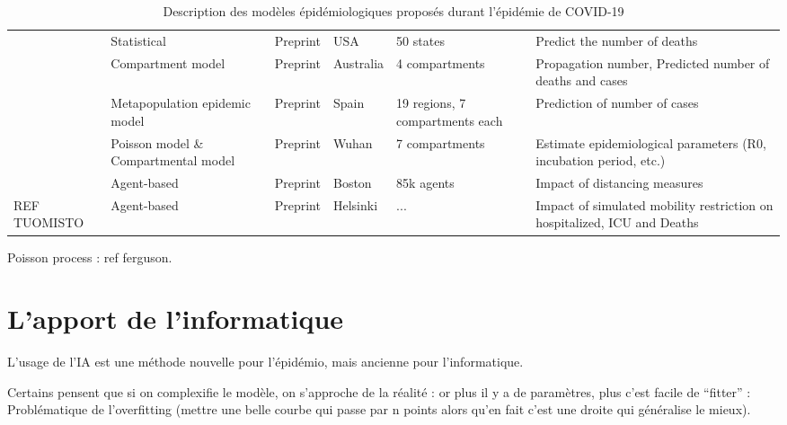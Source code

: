 \documentclass[review]{elsarticle}
\begin{document}
\begin{table}
\begin{adjustbox}{center}
{\begin{tabular}{p{4cm}|p{4cm}|p{2cm}|p{2cm}|p{4cm}|p{11cm}}
  \citet{woody_projections_2020} & Statistical & Preprint & USA & 50 states & Predict the number of deaths  \\
  \citet{platen_stochastic_2020} & Compartment model & Preprint & Australia & 4 compartments & Propagation number, Predicted number of deaths and cases  \\
  \citet{arenas_mathematical_2020} & Metapopulation epidemic model & Preprint & Spain & 19 regions, 7 compartments each & Prediction of number of cases  \\
  \citet{sanche_high_2020} & Poisson model \& Compartmental model & Preprint & Wuhan & 7 compartments & Estimate epidemiological parameters (R0, incubation period, etc.)  \\
  \citet{aleta_modeling_2020} & Agent-based & Preprint & Boston & 85k agents & Impact of distancing measures  \\
  REF TUOMISTO & Agent-based & Preprint & Helsinki & ... & Impact of simulated 	mobility restriction on hospitalized, ICU and Deaths \\

\end{tabular}}
\end{adjustbox}
\caption{Description des modèles épidémiologiques proposés durant l'épidémie de COVID-19}
\label{table:1}
\end{table}


Poisson process : ref ferguson.


\section{L'apport de l'informatique}

L'usage de l'IA est une méthode nouvelle pour l'épidémio, mais ancienne pour l'informatique.


Certains pensent que si on complexifie le modèle, on s'approche de la réalité : or plus il y a de paramètres, plus c'est facile de ``fitter'' : Problématique de l'overfitting (mettre une belle courbe qui passe par n points alors qu'en fait c'est une droite qui généralise le mieux).
\end{document}
